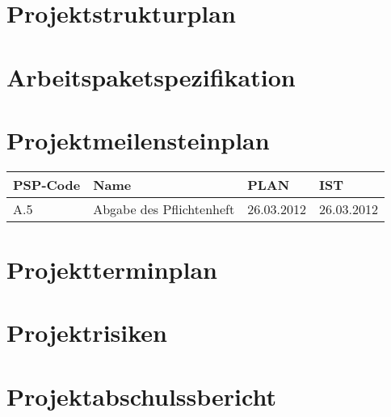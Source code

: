 \documentclass[10pt,a4paper,titlepage]{article}
\begin{document}
\section{Projektstrukturplan}
\newpage

\section{Arbeitspaketspezifikation}
\newpage

\section{Projektmeilensteinplan}
\begin{tabular}[t]{|p{2cm}|p{4.2cm}|p{2cm}|p{2cm}|}
\hline
\textbf{PSP-Code} & \textbf{Name} & \textbf{PLAN} & \textbf{IST} \\
\hline
A.5 & Abgabe des Pflichtenheft & 26.03.2012 & 26.03.2012 \\
\hline
\end{tabular}
\newpage

\section{Projektterminplan}
\newpage

\section{Projektrisiken}
\newpage

\section{Projektabschulssbericht}
\newpage
\end{document}
